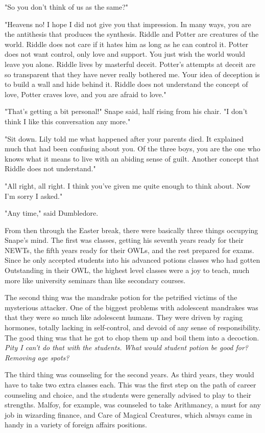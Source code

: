 "So you don't think of us as the same?"

"Heavens no! I hope I did not give you that impression. In many ways, you are the antithesis that produces the synthesis. Riddle and Potter are creatures of the world. Riddle does not care if it hates him as long as he can control it. Potter does not want control, only love and support. You just wish the world would leave you alone. Riddle lives by masterful deceit. Potter's attempts at deceit are so transparent that they have never really bothered me. Your idea of deception is to build a wall and hide behind it. Riddle does not understand the concept of love, Potter craves love, and you are afraid to love."

"That's getting a bit personal!" Snape said, half rising from his chair. "I don't think I like this conversation any more."

"Sit down. Lily told me what happened after your parents died. It explained much that had been confusing about you. Of the three boys, you are the one who knows what it means to live with an abiding sense of guilt. Another concept that Riddle does not understand."

"All right, all right. I think you've given me quite enough to think about. Now I'm sorry I asked."

"Any time," said Dumbledore.

From then through the Easter break, there were basically three things occupying Snape's mind. The first was classes, getting his seventh years ready for their NEWTs, the fifth years ready for their OWLs, and the rest prepared for exams. Since he only accepted students into his advanced potions classes who had gotten Outstanding in their OWL, the highest level classes were a joy to teach, much more like university seminars than like secondary courses.

The second thing was the mandrake potion for the petrified victims of the mysterious attacker. One of the biggest problems with adolescent mandrakes was that they were so much like adolescent humans. They were driven by raging hormones, totally lacking in self-control, and devoid of any sense of responsibility. The good thing was that he got to chop them up and boil them into a decoction. \emph{Pity I can't do that with the students. What would student potion be good for? Removing age spots?}

The third thing was counseling for the second years. As third years, they would have to take two extra classes each. This was the first step on the path of career counseling and choice, and the students were generally advised to play to their strengths. Malfoy, for example, was counseled to take Arithmancy, a must for any job in wizarding finance, and Care of Magical Creatures, which always came in handy in a variety of foreign affairs positions.

